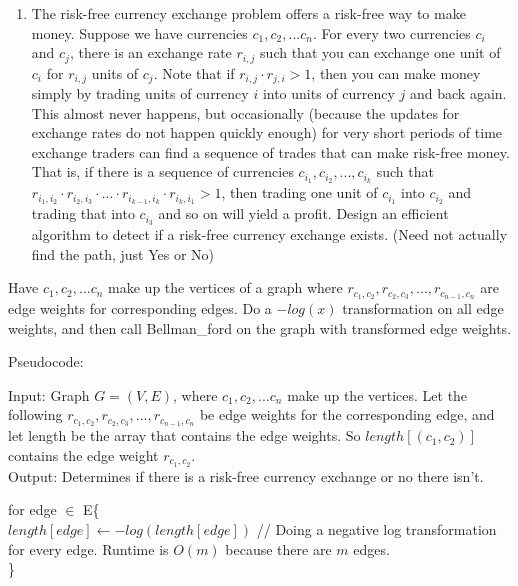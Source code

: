 \documentclass[11pt]{article}
\providecommand{\tightlist}{%
      \setlength{\itemsep}{0pt}\setlength{\parskip}{0pt}}
\begin{document}
    \begin{enumerate}
\def\labelenumi{\arabic{enumi}.}
\setcounter{enumi}{6}
\tightlist
\item
  The risk-free currency exchange problem offers a risk-free way to make
  money. Suppose we have currencies \(c_{1}, c_{2}, ... c_{n}\). For
  every two currencies \(c_{i}\) and \(c_{j}\), there is an exchange
  rate \(r_{i,j}\) such that you can exchange one unit of \(c_{i}\) for
  \(r_{i,j}\) units of \(c_{j}\). Note that if
  \(r_{i,j} \cdot r_{j, i} > 1\), then you can make money simply by
  trading units of currency \(i\) into units of currency \(j\) and back
  again. This almost never happens, but occasionally (because the
  updates for exchange rates do not happen quickly enough) for very
  short periods of time exchange traders can find a sequence of trades
  that can make risk-free money. That is, if there is a sequence of
  currencies \(c_{i_{1}}, c_{i_{2}}, ..., c_{i_{k}}\) such that
  \(r_{i_{1}, i_{2}} \cdot r_{i_{2}, i_{3}} \cdot... \cdot r_{i_{k-1}, i_{k}} \cdot r_{i_{k}, i_{1}} > 1\),
  then trading one unit of \(c_{i_{1}}\) into \(c_{i_{2}}\) and trading
  that into \(c_{i_{3}}\) and so on will yield a profit. Design an
  efficient algorithm to detect if a risk-free currency exchange exists.
  (Need not actually find the path, just Yes or No)
\end{enumerate}

    Have \(c_{1}, c_{2}, ... c_{n}\) make up the vertices of a graph where
\(r_{c_{1}, c_{2}}, r_{c_{2}, c_{3}}, ..., r_{c_{n-1}, c_{n}}\) are edge
weights for corresponding edges. Do a \(-log(x)\) transformation on all
edge weights, and then call Bellman\_ford on the graph with transformed
edge weights.

Pseudocode:

Input: Graph \(G=(V,E)\), where \(c_{1}, c_{2}, ... c_{n}\) make up the
vertices. Let the following
\(r_{c_{1}, c_{2}}, r_{c_{2}, c_{3}}, ..., r_{c_{n-1}, c_{n}}\) be edge
weights for the corresponding edge, and let length be the array that
contains the edge weights. So \(length[(c_{1}, c_{2})]\) contains the
edge weight \(r_{c_{1}, c_{2}}\).\\
Output: Determines if there is a risk-free currency exchange or no there
isn't.

for edge \(\in\) E\{\\
\(length[edge] \leftarrow -log(length[edge])\) // Doing a negative log
transformation for every edge. Runtime is \(O(m)\) because there are
\(m\) edges.\\
\}
\end{document}
